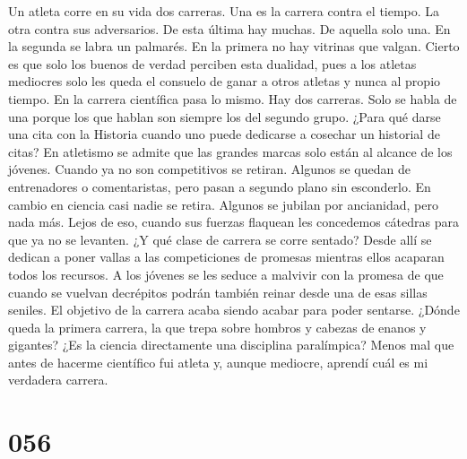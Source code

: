 \documentclass[a4paper,11pt,openright,twocolumn]{book}
\begin{document}
Un atleta corre en su vida dos carreras. Una es la carrera contra el tiempo. La otra contra sus adversarios. De esta última hay muchas. De aquella solo una. En la segunda se labra un palmarés. En la primera no hay vitrinas que valgan. Cierto es que solo los buenos de verdad perciben esta dualidad, pues a los atletas mediocres solo les queda el consuelo de ganar a otros atletas y nunca al propio tiempo. En la carrera científica pasa lo mismo. Hay dos carreras. Solo se habla de una porque los que hablan son siempre los del segundo grupo. ¿Para qué darse una cita con la Historia cuando uno puede dedicarse a cosechar un historial de citas? En atletismo se admite que las grandes marcas solo están al alcance de los jóvenes. Cuando ya no son competitivos se retiran. Algunos se quedan de entrenadores o comentaristas, pero pasan a segundo plano sin esconderlo. En cambio en ciencia casi nadie se retira. Algunos se jubilan por ancianidad, pero nada más. Lejos de eso, cuando sus fuerzas flaquean les concedemos cátedras para que ya no se levanten. ¿Y qué clase de carrera se corre sentado? Desde allí se dedican a poner vallas a las competiciones de promesas mientras ellos acaparan todos los recursos. A los jóvenes se les seduce a malvivir con la promesa de que cuando se vuelvan decrépitos podrán también reinar desde una de esas sillas seniles. El objetivo de la carrera acaba siendo acabar para poder sentarse. ¿Dónde queda la primera carrera, la que trepa sobre hombros y cabezas de enanos y gigantes? ¿Es la ciencia directamente una disciplina paralímpica? Menos mal que antes de hacerme científico fui atleta y, aunque mediocre, aprendí cuál es mi verdadera carrera. 

\section*{056}
\end{document}
